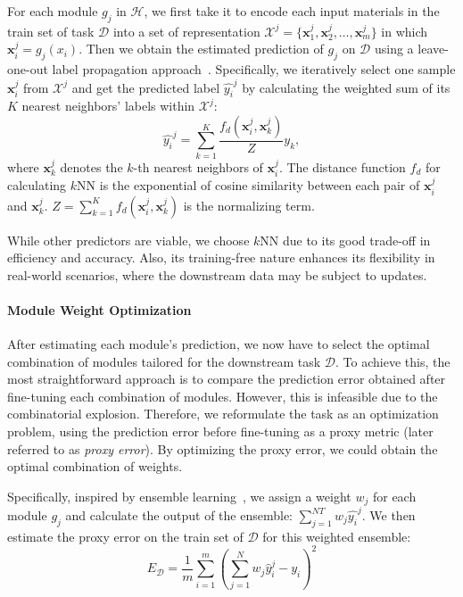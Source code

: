 For each module $g_j$ in $\mathcal{H}$, we first take it to encode each input materials in the train set of task $\mathcal{D}$ into a set of representation $\mathcal{X}^j = \{\mathbf{x}_1^j, \mathbf{x}_2^j, \ldots, \mathbf{x}_m^j\}$ in which $\mathbf{x}_i^j = g_j({x}_i)$. Then we obtain the estimated prediction of $g_j$ on $\mathcal{D}$ using a leave-one-out label propagation approach~\cite{iscen2019label}. Specifically, we iteratively select one sample $\mathbf{x}_i^j$ from $\mathcal{X}^j$ and get the predicted label $\hat{y_i}^j$ by calculating the weighted sum of its $K$ nearest neighbors' labels within $\mathcal{X}^j$:
\begin{equation}
    \label{eq:knn}
    \hat{y_i}^j = \sum_{k=1}^{K} \frac{f_d(\mathbf{x}_i^j,\mathbf{x}_{k}^j)}{Z} y_{k},
\end{equation}
where $\mathbf{x}_{k}^j$ denotes the $k$-th nearest neighbors of $\mathbf{x}_i^j$. The distance function $f_d$ for calculating $k$NN is the exponential of cosine similarity between each pair of $\mathbf{x}_i^j$ and $\mathbf{x}_k^j$. $Z=\sum_{k=1}^{K} f_d(\mathbf{x}_i^j,\mathbf{x}_{k}^j)$  is the normalizing term.

While other predictors are viable, we choose $k$NN due to its good trade-off in efficiency and accuracy. Also, its training-free nature enhances its flexibility in real-world scenarios, where the downstream data may be subject to updates.

\paragraph{Module Weight Optimization}
After estimating each module's prediction, we now have to select the optimal combination of modules tailored for the downstream task $\mathcal{D}$.
To achieve this, the most straightforward approach is to compare the prediction error obtained after fine-tuning each combination of modules. However, this is infeasible due to the combinatorial explosion. Therefore, we reformulate the task as an optimization problem, using the prediction error before fine-tuning as a proxy metric (later referred to as \textit{proxy error}). By optimizing the proxy error, we could obtain the optimal combination of weights.

Specifically, inspired by ensemble learning~\citep{zhou2002ensembling, zhou2016learnware}, we assign a weight $w_j$ for each module $g_j$ and calculate the output of the ensemble: $\sum_{j=1}^{NT} w_j\hat{y_i}^j$.
We then estimate the proxy error on the train set of $\mathcal{D}$ for this weighted ensemble:
\begin{equation}
    \label{eq:proxy}
    E_\mathcal{D} =\frac{1}{m}\sum_{i=1}^{m}(\sum_{j=1}^{N} w_j \hat{y}_i^j - y_i)^2
\end{equation}

